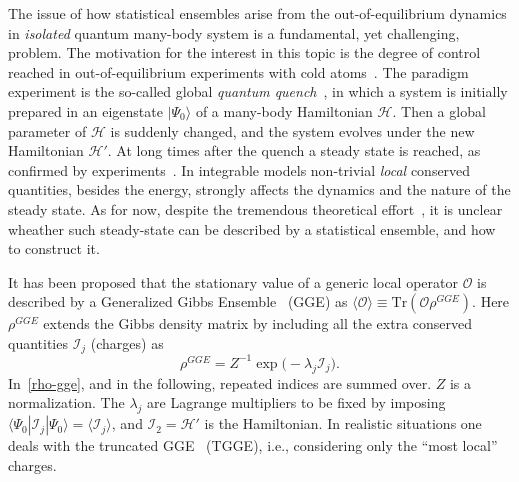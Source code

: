 \documentclass[twocolumn,superscriptaddress,prb,10pt]{revtex4-1}
\begin{document}
The issue of how statistical ensembles arise from the out-of-equilibrium 
dynamics in {\it isolated} quantum many-body system is a fundamental, 
yet challenging, problem. The motivation for the interest 
in this topic is the degree of control reached in out-of-equilibrium 
experiments with cold atoms~\cite{bloch-2008,greiner-2002,kinoshita-2006,
hofferberth-2007,trotzky-2012,gring-2012,cheneau-2012,
schneider-2012,kunhert-2013,langen-2013,meinert-2013,fukuhara-2013,
ronzheimer-2013,braun-2014,langen-2015}. The paradigm experiment is the so-called global 
{\it quantum quench}~\cite{polkovnikov-2011}, in which a system is initially 
prepared in an eigenstate $|\Psi_0\rangle$ of a many-body Hamiltonian ${\mathcal 
H}$. Then a global parameter of ${\mathcal H}$ is suddenly changed, and the 
system evolves under the new Hamiltonian ${\mathcal H}'$. At long times 
after the quench a steady state is reached, as confirmed by 
experiments~\cite{kinoshita-2006}. In integrable models non-trivial {\it local} 
conserved quantities, besides the energy, 
strongly affects the dynamics and the nature of the steady state. As for now,  
despite the tremendous theoretical effort~\cite{calabrese-2006,rigol-2007,calabrese-2007,
kollath-2007,manmana-2007,rigol-2008,cramer-2008,barthel-2008,kollar-2008,moeckel-2008,
iucci-2009,rossini-2009,barmettler-2009,biroli-2010,rossini-2010,fioretto-2010,
gogolin-2011,banuls-2011,calabrese-2011,rigol-2011,calabrese-2012,caux-2012,essler-2012,
cazalilla-2012,mossel-2012a,collura-2013,mussardo-2013,caux-2013,fagotti-2013a,fagotti-2013,
sotiriadis-2014,fagotti-2014,essler-2014,goldstein-2014,de-nardis-2014,wright-2014,
pozsgay-2014,wouters-2014,mestyian-2015,ilievski-2015a}, 
it is unclear wheather such steady-state can be described by a statistical 
ensemble, and how to construct it. 

It has been proposed that the stationary value of a generic 
local operator ${\mathcal O}$ is described by a Generalized Gibbs Ensemble~\cite{
rigol-2007,rigol-2008} (GGE) as $\langle{\mathcal O}\rangle\equiv\textrm{Tr}({\mathcal O}
\rho^{GGE})$. Here $\rho^{GGE}$ extends the Gibbs density matrix by including  all 
the extra conserved quantities $ {\mathcal I}_j$ (charges) as 
%
\begin{equation}
\rho^{GGE}=Z^{-1}\exp\big(-\lambda_j{\mathcal I}_j\big). 
\label{rho-gge}
\end{equation}
%
In~\eqref{rho-gge}, and in the following, repeated indices are summed over. 
$Z$ is a normalization. The $\lambda_j$ are Lagrange multipliers to be fixed 
by imposing $\langle\Psi_0|{\mathcal I}_j|\Psi_0\rangle=\langle{\mathcal 
I}_j\rangle$, and ${\mathcal I}_2={\mathcal H}'$ is the Hamiltonian. 
In realistic situations one deals with the truncated GGE~\cite{fagotti-2013} (TGGE), 
i.e., considering only the ``most local'' charges. 
\end{document}
